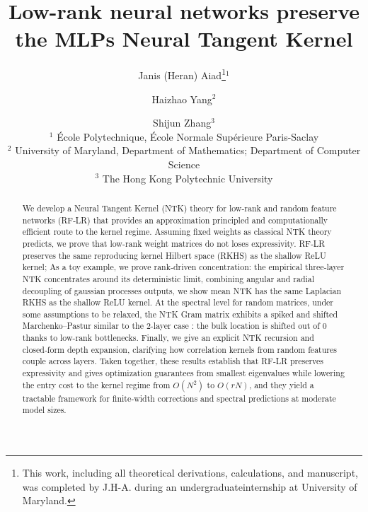 \documentclass[letterpaper, 10pt, dvipsnames]{article}
\numberwithin{equation}{section}
\theoremstyle{definition}
\begin{document}



\title{Low-rank neural networks preserve the MLPs Neural Tangent Kernel}

\author{
  Janis (Heran) Aiad\thanks{This work, including all theoretical derivations, calculations, and manuscript, was completed by J.H-A. during an undergraduateinternship at University of Maryland.}$^{1}$ \and Haizhao Yang$^{2}$ \and Shijun Zhang$^{3}$ \\
  $^{1}$ École Polytechnique, École Normale Supérieure Paris-Saclay  \\
  $^{2}$ University of Maryland, Department of Mathematics; Department of Computer Science \\
  $^{3}$ The Hong Kong Polytechnic University
}


\maketitle

\begin{abstract}
We develop a Neural Tangent Kernel (NTK) theory for low-rank and random feature networks (RF‑LR) that provides an approximation principled and computationally 
efficient route to the kernel regime. Assuming fixed weights as classical NTK theory predicts, we prove that low-rank weight matrices
do not loses expressivity. RF‑LR preserves the same reproducing kernel Hilbert space (RKHS) as the shallow ReLU kernel; 
As a toy example, we prove rank‑driven concentration: the empirical three‑layer NTK concentrates around its 
deterministic limit, combining angular and radial decoupling of gaussian processes outputs, we show mean NTK
has the same Laplacian RKHS as the shallow ReLU kernel. At the spectral level for random matrices, under some assumptions to be relaxed, the NTK Gram matrix exhibits a 
spiked and shifted Marchenko–Pastur similar to the 2-layer case : the bulk location is shifted out of 0 thanks to low-rank bottlenecks.
Finally, we give an explicit NTK recursion and closed‑form depth expansion, clarifying how correlation kernels from random features couple across layers.
Taken together, these results establish that RF‑LR preserves expressivity and gives optimization guarantees from smallest eigenvalues
while lowering the entry cost to the kernel regime from \(O(N^2)\) to \(O(rN)\), 
and they yield a tractable framework for finite‑width corrections and spectral predictions at moderate model sizes.
\end{abstract}


\tableofcontents
\vspace{2em}

\newpage




\newpage





\newpage

\end{document}
